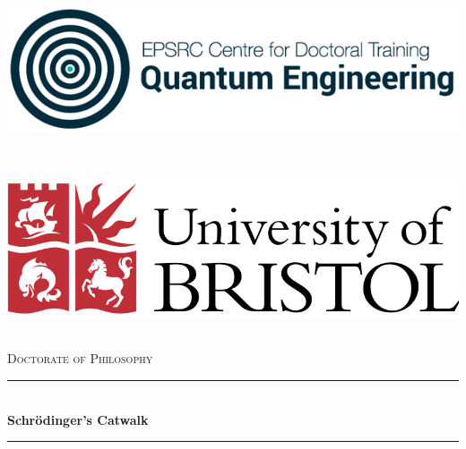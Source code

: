 \begin{titlepage}

    \newcommand{\HRule}{\rule{\linewidth}{0.5mm}} %
    
    \center %
     
    \vspace{1cm}
    \begin{minipage}{0.4\textwidth}
    \begin{flushleft} 
        \includegraphics[scale=2]{logos/qecdt.png}
    \end{flushleft}
    \end{minipage}
    ~
    \begin{minipage}{0.4\textwidth}
    \begin{flushright} \large
        \includegraphics[scale=0.2]{logos/bristol_uni.png}
    \end{flushright}
    \end{minipage}\\[1cm]
    
    \vspace{2cm}
    \textsc{\LARGE Doctorate of Philosophy \\  }
    
    \vspace{1cm}
    \HRule \\[0.4cm]
    { \huge \bfseries Schr\"odinger's Catwalk}\\[0.4cm] %
    \HRule \\[1.5cm]
    

\end{titlepage}
